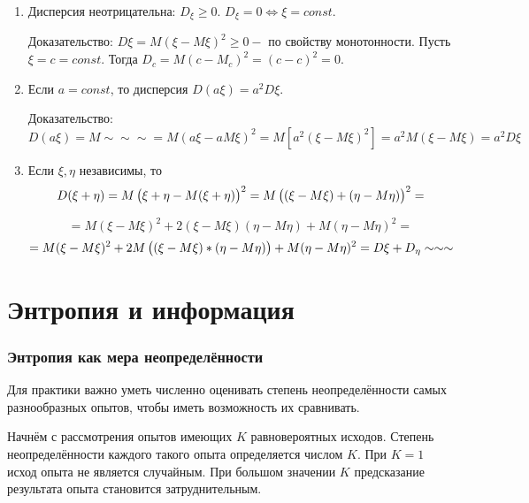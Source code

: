 \documentclass[a4paper,twoside,12pt]{report}
\begin{document}
	\begin{enumerate}

	\item	Дисперсия неотрицательна: $D_\xi \ge 0.$ $D_\xi = 0 \Leftrightarrow \xi = const$. 
		
		Доказательство: $D\xi = M(\xi-M\xi)^2 \ge 0 - $ по свойству монотонности. Пусть $\xi = c = const$. Тогда
		$D_c = M(c-M_c)^2 =(c - c)^2 = 0$.


	\item	Если $a = const$, то дисперсия $D(a\xi) = a^2 D\xi$. 
	
		Доказательство: 
		$D(a\xi) = M \sim\sim\sim 
		         = M(a\xi - a M\xi)^2
		         = M[a^2 (\xi-M\xi)^2]
		         = a^2 M(\xi - M\xi)
		         = a^2 D\xi
		$
		

	\item	Если $\xi,\eta$ независимы, то 
		$$
		  D(\xi + \eta) = M\left(  \xi \strut + \eta - M(\xi +\eta)    \right)^2 
		                = M\left( (\xi - M\xi) \strut + (\eta - M\eta) \right)^2
		                =
		$$
		
		$$		                
		                = M(\xi - M\xi)^2 + 2(\xi-M\xi)(\eta - M\eta) + M(\eta - M\eta)^2
		                =
		$$ $$
		                = M(\xi - M\xi)^2 + 2M\left( (\xi - M\xi) \strut * (\eta - M\eta)\right) 
		                  + M(\eta - M\eta)^2
		                = D\xi + D_\eta   \sim \sim \sim
		$$
	
	\end{enumerate}
	
	
	
	

\section{Энтропия и информация}

\subsubsection{Энтропия как мера неопределённости}

	Для практики важно уметь численно оценивать степень неопределённости самых разнообразных опытов, чтобы иметь возможность их сравнивать. 
	
	Начнём с рассмотрения опытов имеющих $K$ равновероятных исходов. Степень неопределённости каждого такого опыта определяется числом $K$. При $K = 1$ исход опыта не является случайным. При большом значении $K$ предсказание результата опыта становится затруднительным.
	
\end{document}
